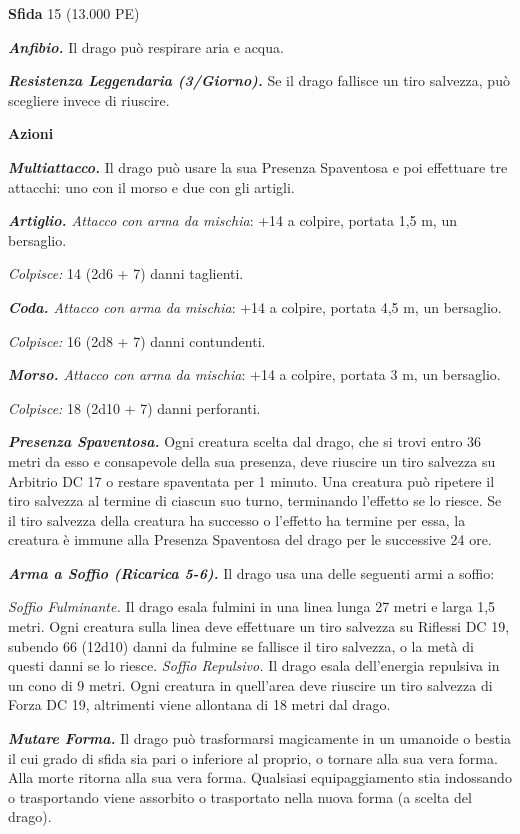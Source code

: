 \begin{multicols}{2}
\textbf{Sfida} 15 (13.000 PE)

\emph{\textbf{Anfibio.}} Il drago può respirare aria e acqua.

\emph{\textbf{Resistenza Leggendaria (3/Giorno).}} Se il drago fallisce
un tiro salvezza, può scegliere invece di riuscire.

\textbf{Azioni}

\emph{\textbf{Multiattacco.}} Il drago può usare la sua Presenza
Spaventosa e poi effettuare tre attacchi: uno con il morso e due con gli
artigli.

\emph{\textbf{Artiglio.} Attacco con arma da mischia}: +14 a colpire,
portata 1,5 m, un bersaglio.

\emph{Colpisce:} 14 (2d6 + 7) danni taglienti.

\emph{\textbf{Coda.} Attacco con arma da mischia}: +14 a colpire,
portata 4,5 m, un bersaglio.

\emph{Colpisce:} 16 (2d8 + 7) danni contundenti.

\emph{\textbf{Morso.} Attacco con arma da mischia}: +14 a colpire,
portata 3 m, un bersaglio.

\emph{Colpisce:} 18 (2d10 + 7) danni perforanti.

\emph{\textbf{Presenza Spaventosa.}} Ogni creatura scelta dal drago, che
si trovi entro 36 metri da esso e consapevole della sua presenza, deve
riuscire un tiro salvezza su Arbitrio DC 17 o restare spaventata per 1
minuto. Una creatura può ripetere il tiro salvezza al termine di ciascun
suo turno, terminando l'effetto se lo riesce. Se il tiro salvezza della
creatura ha successo o l'effetto ha termine per essa, la creatura è
immune alla Presenza Spaventosa del drago per le successive 24 ore.

\emph{\textbf{Arma a Soffio (Ricarica 5-6).}} Il drago usa una delle
seguenti armi a soffio:

\emph{Soffio Fulminante.} Il drago esala fulmini in una linea lunga 27
metri e larga 1,5 metri. Ogni creatura sulla linea deve effettuare un
tiro salvezza su Riflessi DC 19, subendo 66 (12d10) danni da fulmine se
fallisce il tiro salvezza, o la metà di questi danni se lo riesce.
\emph{Soffio Repulsivo.} Il drago esala dell'energia repulsiva in un
cono di 9 metri. Ogni creatura in quell'area deve riuscire un tiro
salvezza di Forza DC 19, altrimenti viene allontana di 18 metri dal
drago.

\emph{\textbf{Mutare Forma.}} Il drago può trasformarsi magicamente in
un umanoide o bestia il cui grado di sfida sia pari o inferiore al
proprio, o tornare alla sua vera forma. Alla morte ritorna alla sua vera
forma. Qualsiasi equipaggiamento stia indossando o trasportando viene
assorbito o trasportato nella nuova forma (a scelta del drago).


\end{multicols}
